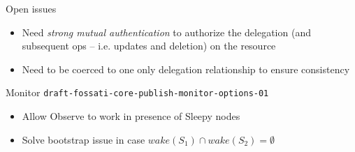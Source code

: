 \documentclass{beamer}
\begin{document}
\begin{frame}{Open issues}

\begin{itemize}
 \item Need \emph{strong mutual authentication} to authorize the delegation (and subsequent ops -- i.e. updates and deletion) on the resource
 \item Need to be coerced to one only delegation relationship to ensure consistency
\end{itemize}

\end{frame}

\begin{frame}{Monitor \hspace{5cm} {\tiny \texttt{draft-fossati-core-publish-monitor-options-01}}}

\begin{itemize}
 \item Allow Observe to work in presence of Sleepy nodes %
 \item Solve bootstrap issue in case {\scriptsize $wake(S_1) \cap wake(S_2) = \emptyset$}
\end{itemize}

\end{frame}
\end{document}
